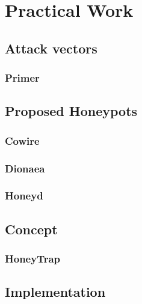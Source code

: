\chapter{Practical Work}

\section{Attack vectors}

\subsection{Primer}

\section{Proposed Honeypots}

\subsection{Cowire}

\subsection{Dionaea}

\subsection{Honeyd}

\section{Concept}

\subsection{HoneyTrap}

\section{Implementation}